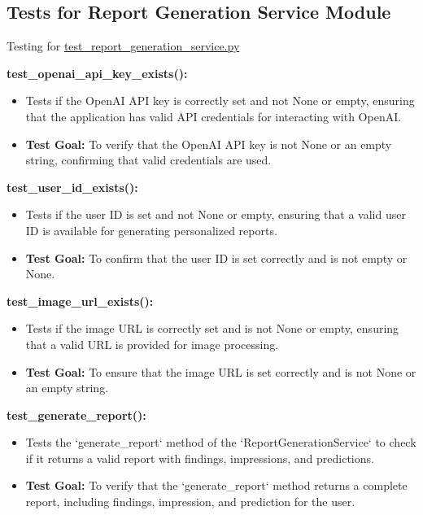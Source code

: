 \documentclass[12pt, titlepage]{article}
\begin{document}
\begin{enumerate}
\subsection{Tests for {Report Generation Service Module}}
Testing for \href{https://github.com/RezaJodeiri/CXR-Capstone/blob/main/src/backend/test/test_report_generation_service.py}{test\_report\_generation\_service.py}

\textbf{test\_openai\_api\_key\_exists():}  
\begin{itemize}
    \item Tests if the OpenAI API key is correctly set and not None or empty, ensuring that the application has valid API credentials for interacting with OpenAI.
    \item \textbf{Test Goal:} To verify that the OpenAI API key is not None or an empty string, confirming that valid credentials are used.
    \newline
\end{itemize}

\textbf{test\_user\_id\_exists():}  
\begin{itemize}
    \item Tests if the user ID is set and not None or empty, ensuring that a valid user ID is available for generating personalized reports.
    \item \textbf{Test Goal:} To confirm that the user ID is set correctly and is not empty or None.
    \newline
\end{itemize}

\textbf{test\_image\_url\_exists():}  
\begin{itemize}
    \item Tests if the image URL is correctly set and is not None or empty, ensuring that a valid URL is provided for image processing.
    \item \textbf{Test Goal:} To ensure that the image URL is set correctly and is not None or an empty string.
    \newline
\end{itemize}

\textbf{test\_generate\_report():}  
\begin{itemize}
    \item Tests the `generate\_report` method of the `ReportGenerationService` to check if it returns a valid report with findings, impressions, and predictions.
    \item \textbf{Test Goal:} To verify that the `generate\_report` method returns a complete report, including findings, impression, and prediction for the user.
    \newline
\end{itemize}


\end{enumerate}
\end{document}
